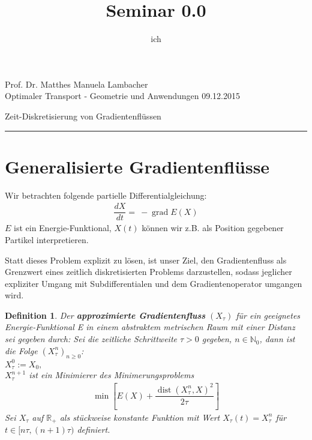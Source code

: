 \documentclass[11pt,a4paper,notitlepage]{scrreprt}
\author{ich}
\title{Seminar 0.0}
\newcommand{\RR}{\mathbb{R}}
\newcommand{\NN}{\mathbb{N}}
\newcommand{\dist}{\operatorname{dist}}
\newcommand{\grad}{\operatorname{grad}}
\newtheorem{defi}{Definition}[section]
\begin{document}
\parindent 0pt



\pagestyle{plain}



 Prof. Dr. Matthes \hfill Manuela Lambacher\\
 Optimaler Transport - Geometrie und Anwendungen \hfill 09.12.2015
 \begin{center}
  {\huge{Zeit-Diskretisierung von Gradientenflüssen}} 
 \end{center}
 
 \hrule
 
\renewcommand{\thechapter}{\arabic{section}}
\renewcommand{\thesection}{\arabic{section}}
\section{Generalisierte Gradientenflüsse}

Wir betrachten folgende partielle Differentialgleichung: 
\begin{eqnarray}
\dfrac{dX}{dt}=~-\grad E(X) \label{eq1}
\end{eqnarray}
$E$ ist ein Energie-Funktional, $X(t)$ können wir z.B. als Position gegebener Partikel interpretieren.\newline


Statt dieses Problem explizit zu lösen, ist unser Ziel, den Gradientenfluss als Grenzwert eines zeitlich diskretisierten Problems darzustellen, sodass jeglicher expliziter Umgang mit Subdifferentialen und dem Gradientenoperator umgangen wird.

\begin{defi}\label{approx}
Der \textbf{approximierte Gradientenfluss} $(X_\tau)$ für ein geeignetes Energie-Funktional E in einem abstraktem metrischen Raum mit einer Distanz sei gegeben durch:
\newline
Sei die zeitliche Schrittweite $\tau > 0$ gegeben, $n\in\NN_0$, dann ist die Folge $\left( X^n_\tau \right)_{n\geq 0}$:
\\
$X_\tau^0:=X_0,$
\\
$X_\tau^{n+1}$ ist ein Minimierer des Minimerungsproblems
\begin{eqnarray}
\min\left[E(X)+\dfrac{\dist(X_\tau^n,X)^2}{2\tau}\right] \label{Min}
\end{eqnarray}
Sei $X_\tau$ auf $\RR_+$ als stückweise konstante Funktion mit Wert $X_\tau(t)=X^n_\tau$ für $t\in [n\tau,(n+1)\tau)$ definiert.
\end{defi}
\end{document}

